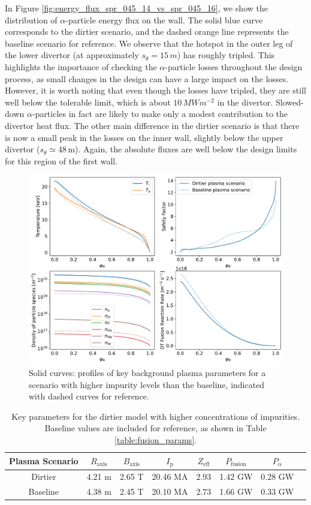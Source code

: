 \documentclass[10pt, a4paper, twoside]{article}
\begin{document}
In Figure \ref{fig:energy_flux_spr_045_14_vs_spr_045_16}, we show the distribution of $\alpha$-particle energy flux on the wall. The solid blue curve corresponds to the dirtier scenario, and the dashed orange line represents the baseline scenario for reference. We observe that the hotspot in the outer leg of the lower divertor (at approximately \( s_\theta=15\,\si{m} \)) has roughly tripled. This highlights the importance of checking the $\alpha$-particle losses throughout the design process, as small changes in the design can have a large impact on the losses. However, it is worth noting that even though the losses have tripled, they are still well below the tolerable limit, which is about \( 10\,\si{MWm^{-2}} \) in the divertor. Slowed-down $\alpha$-particles in fact are likely to make only a modest contribution to the divertor heat flux. The other main difference in the dirtier scenario is that there is now a small peak in the losses on the inner wall, slightly below the upper divertor ($s_{\theta} \simeq 48\,$m). Again, the absolute fluxes are well below the design limits for this region of the first wall.  

\begin{figure}[!ht]
    \centering
    \includegraphics[width=0.9\linewidth]{Figures/background_plasma_curves_14_vs_16.pdf}
    \caption{Solid curves: profiles of key background plasma parameters for a scenario with higher impurity levels than the baseline, indicated with dashed curves for reference.}
    \label{fig:plasma_profiles_spr_045_14}
\end{figure}

\begin{table}[!ht]
\centering
\begin{tabular}{cccccccc}
\hline
Plasma Scenario & $R_{\text{axis}}$ & $B_{\text{axis}}$ & $I_{\text{p}}$ & $Z_{\text{eff}}$ & $P_{\text{fusion}}$ & $P_{\alpha}$ \\
\hline
Dirtier & 4.21 m & 2.65 T & 20.46 MA & 2.93 & 1.42 GW & 0.28 GW \\
Baseline & 4.38 m & 2.45 T & 20.10 MA & 2.73 & 1.66 GW & 0.33 GW \\
\hline
\end{tabular}
\caption{Key parameters for the dirtier model with higher concentrations of impurities. Baseline values are included for reference, as shown in Table \ref{table:fusion_params}.}
\label{table:fusion_params_dirty}
\end{table}
\end{document}
